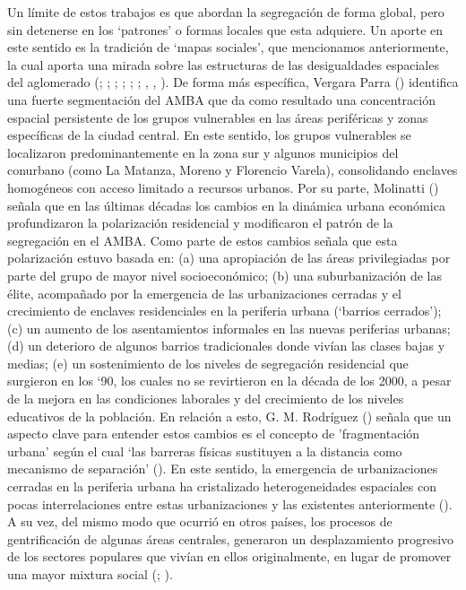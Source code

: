 \documentclass[
  spanish,
  a4paper,%
  chapterprefix=true,%
  DIV=calc,%
  twoside]{scrbook}%
\begin{document}
Un límite de estos trabajos es que abordan la segregación de forma
global, pero sin detenerse en los `patrones' o formas locales que esta
adquiere. Un aporte en este sentido es la tradición de `mapas sociales',
que mencionamos anteriormente, la cual aporta una mirada sobre las
estructuras de las desigualdades espaciales del aglomerado (; ; ; ; ; ; , , ). De forma más específica,
Vergara Parra () identifica una fuerte segmentación del AMBA que da
como resultado una concentración espacial persistente de los grupos
vulnerables en las áreas periféricas y zonas específicas de la ciudad
central. En este sentido, los grupos vulnerables se localizaron
predominantemente en la zona sur y algunos municipios del conurbano
(como La Matanza, Moreno y Florencio Varela), consolidando enclaves
homogéneos con acceso limitado a recursos urbanos. Por su parte,
Molinatti () señala que en las últimas décadas los cambios en la
dinámica urbana económica profundizaron la polarización residencial y
modificaron el patrón de la segregación en el AMBA. Como parte de estos
cambios señala que esta polarización estuvo basada en: (a) una
apropiación de las áreas privilegiadas por parte del grupo de mayor
nivel socioeconómico; (b) una suburbanización de las élite, acompañado
por la emergencia de las urbanizaciones cerradas y el crecimiento de
enclaves residenciales en la periferia urbana (`barrios cerrados'); (c)
un aumento de los asentamientos informales en las nuevas periferias
urbanas; (d) un deterioro de algunos barrios tradicionales donde vivían
las clases bajas y medias; (e) un sostenimiento de los niveles de
segregación residencial que surgieron en los `90, los cuales no se
revirtieron en la década de los 2000, a pesar de la mejora en las
condiciones laborales y del crecimiento de los niveles educativos de la
población. En relación a esto, G. M. Rodríguez ()
señala que un aspecto clave para entender estos cambios es el concepto
de 'fragmentación urbana' según el cual `las barreras físicas sustituyen
a la distancia como mecanismo de separación' ().
En este sentido, la emergencia de
urbanizaciones cerradas en la periferia urbana ha cristalizado
heterogeneidades espaciales con pocas interrelaciones entre estas
urbanizaciones y las existentes anteriormente ().
A su vez, del mismo modo que ocurrió en otros
países, los procesos de gentrificación de algunas áreas centrales,
generaron un desplazamiento progresivo de los sectores populares que
vivían en ellos originalmente, en lugar de promover una mayor mixtura
social (; ).
\end{document}
